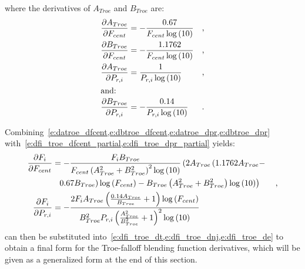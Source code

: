 \documentclass[12pt]{article}
\begin{document}
where the derivatives of $A_{Troe}$ and $B_{Troe}$ are:
\begin{align}
 \frac{\partial A_{Troe} }{\partial F_{cent} } &= - \frac{0.67}{F_{cent} \log{\left (10 \right )}} & \text{,} \label{e:datroe_dfcent} \\
\frac{\partial B_{Troe} }{\partial F_{cent} } &= - \frac{1.1762}{F_{cent} \log{\left (10 \right )}} & \text{,} \label{e:dbtroe_dfcent} \\
\frac{\partial A_{Troe} }{\partial P_{r, i} } &= \frac{1}{P_{r, i} \log{\left (10 \right )}} & \text{,} \label{e:datroe_dpr} \\
\intertext{and:}
\frac{\partial B_{Troe} }{\partial P_{r, i} } &= - \frac{0.14}{P_{r, i} \log{\left (10 \right )}} & \text{.} \label{e:dbtroe_dpr} \\
\end{align}

Combining~\cref{e:datroe_dfcent,e:dbtroe_dfcent,e:datroe_dpr,e:dbtroe_dpr} with~\cref{e:dfi_troe_dfcent_partial,e:dfi_troe_dpr_partial} yields:
\begin{align}
\frac{\partial F_{i} }{\partial F_{cent} } &= - \frac{F_{i} B_{Troe}}{F_{cent} \left(A_{Troe}^{2} + B_{Troe}^{2}\right)^{2} \log{\left (10 \right )}} \left(2 A_{Troe} \left( 1.1762 A_{Troe} - \right. \right . & \nonumber \\
& \mathindent[s] \left. \left. 0.67 B_{Troe}\right) \log{\left (F_{cent} \right )} - B_{Troe} \left(A_{Troe}^{2} + B_{Troe}^{2}\right) \log{\left (10 \right )}\right) & \text{,} \label{e:dfi_troe_dfcent} \\
\frac{\partial F_{i} }{\partial P_{r, i} } &= - \frac{2 F_{i} A_{Troe} \left(\frac{0.14 A_{Troe}}{B_{Troe}} + 1\right) \log{\left (F_{cent} \right )}}{B_{Troe}^{2} P_{r, i} \left(\frac{A_{Troe}^{2}}{B_{Troe}^{2}} + 1\right)^{2} \log{\left (10 \right )}} \label{e:dfi_troe_dpr} &
\end{align}
 can then be substituted into~\cref{e:dfi_troe_dt,e:dfi_troe_dnj,e:dfi_troe_de} to obtain a final form for the Troe-falloff blending function derivatives, which will be given as a generalized form at the end of this section.
\end{document}
